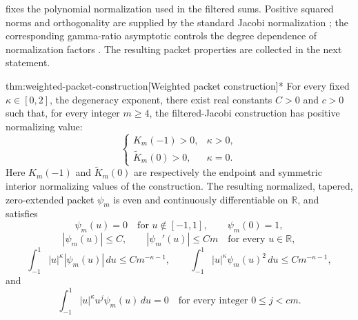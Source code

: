  fixes the polynomial normalization used in the filtered sums. Positive squared norms and orthogonality are supplied by the standard Jacobi normalization \citep[Table 18.3.1, Jacobi row and caption]{https://dlmf.nist.gov/18.3}; the corresponding gamma-ratio asymptotic controls the degree dependence of normalization factors \citep[equation (5.11.12), positive real axis]{https://dlmf.nist.gov/5.11.E12}. The resulting packet properties are collected in the next statement.

\begin{theoremv}{thm:weighted-packet-construction}[Weighted packet construction]*
For every fixed \(\kappa\in[0,2]\), the degeneracy exponent, there exist real constants \(C>0\) and \(c>0\) such that, for every integer \(m\ge4\), the filtered-Jacobi construction has positive normalizing value:
\[
\begin{cases}
K_m(-1)>0, & \kappa>0,\\
\widetilde K_m(0)>0, & \kappa=0.
\end{cases}
\]
Here \(K_m(-1)\) and \(\widetilde K_m(0)\) are respectively the endpoint and symmetric interior normalizing values of the construction. The resulting normalized, tapered, zero-extended packet \(\psi_m\) is even and continuously differentiable on \(\mathbb R\), and satisfies
\[
\psi_m(u)=0\quad\text{for }u\notin[-1,1],
\qquad
\psi_m(0)=1,
\]
\[
|\psi_m(u)|\le C,\qquad
|\psi_m'(u)|\le Cm
\quad\text{for every }u\in\mathbb R,
\]
\[
\int_{-1}^{1}|u|^\kappa|\psi_m(u)|\,du
\le Cm^{-\kappa-1},
\qquad
\int_{-1}^{1}|u|^\kappa\psi_m(u)^2\,du
\le Cm^{-\kappa-1},
\]
and
\[
\int_{-1}^{1}|u|^\kappa u^j\psi_m(u)\,du=0
\quad\text{for every integer }0\le j<cm.
\]
\end{theoremv}

